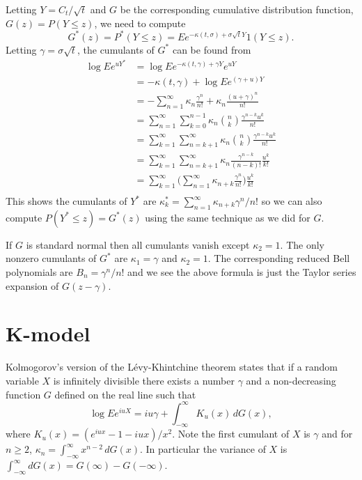 \documentclass[11pt]{article}
\begin{document}
Letting \(Y = C_t/\sqrt{t}\) and \(G\) be the corresponding cumulative
distribution function, \(G(z) = P(Y\le z)\), we need to compute
\[
G^*(z) = P^*(Y\le z) = Ee^{-\kappa(t,\sigma) + \sigma\sqrt{t}Y}1(Y\le z).
\]
Letting \(\gamma = \sigma\sqrt{t}\), the cumulants of \(G^*\) can be found from
\begin{align*}
\log E e^{uY^*} &= \log E e^{-\kappa(t,\gamma) + \gamma Y} e^{uY}\\
&= -\kappa(t, \gamma) + \log E e^{(\gamma + u) Y}\\
&= -\sum_{n=1}^\infty \kappa_n \frac{\gamma^n}{n!} 
	+ \kappa_n \frac{(u + \gamma)^n}{n!}\\
&= \sum_{n=1}^\infty \sum_{k=0}^{n-1} \kappa_n \binom{n}{k}
	\frac{\gamma^{n - k}u^k}{n!}\\
&= \sum_{k=1}^\infty \sum_{n=k + 1}^\infty \kappa_n 
	\binom{n}{k}\frac{\gamma^{n - k}u^k}{n!}\\
&= \sum_{k=1}^\infty \sum_{n=k + 1}^\infty \kappa_n \frac{\gamma^{n-k}}{(n-k)!}
	\frac{u^k}{k!}\\
&= \sum_{k=1}^\infty 
	\bigl(\sum_{n=1}^\infty \kappa_{n+k} \frac{\gamma^n}{n!}\bigr)
	\frac{u^k}{k!}\\
\end{align*}
This shows the cumulants of \(Y^*\) are 
\(\kappa^*_k = \sum_{n=1}^\infty \kappa_{n + k}\gamma^n/n!\)
so we can also compute \(P(Y^* \le z) = G^*(z)\) using the same
technique as we did for \(G\).

If \(G\) is standard normal then all cumulants vanish except \(\kappa_2 = 1\). The only nonzero cumulants of \(G^*\) are \(\kappa_1 = \gamma\)
and \(\kappa_2 = 1\). The corresponding reduced Bell polynomials
are \(B_n = \gamma^n/n!\) and we see the above formula is just
the Taylor series expansion of \(G(z - \gamma)\).
%
%
\section{K-model}
Kolmogorov's version of the L\'evy-Khintchine theorem\cite{?}
states that if a random variable \(X\) is infinitely divisible
there exists a number \(\gamma\) and a non-decreasing function
\(G\) defined on the real line such that
\[
\log Ee^{iuX} = iu\gamma + \int_{-\infty}^\infty K_u(x)\,dG(x),
\]
where \(K_u(x) = (e^{iux} - 1 - iux)/x^2\). Note the first
cumulant of \(X\) is \(\gamma\) and for \(n\ge 2\),
\(\kappa_n = \int_{-\infty}^\infty x^{n-2}\,dG(x)\). In particular
the variance of \(X\) is 
\(\int_{-\infty}^\infty dG(x) = G(\infty) - G(-\infty)\).
\end{document}

